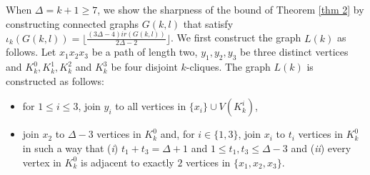 \documentclass[11pt]{article}
\newcommand{\2}{ \vspace{0.2cm} }
\newcommand{\1}{ \vspace{0.1cm} }
\begin{document}
\indent When $\Delta = k +1 \geq 7$, we show the sharpness of the bound of Theorem \ref{thm 2} by constructing connected graphs $G(k, l)$ that satisfy $\iota_{k}(G(k, l)) = \Big\lfloor\frac{(3\Delta - 4)ir(G(k, l))}{2\Delta - 2}\Big\rfloor$.  We first construct the graph $L(k)$ as follows. Let $x_{1}x_{2}x_{3}$ be a path of length two, $y_{1}, y_{2}, y_{3}$ be three distinct vertices and $K^{0}_{k}, K^{1}_{k}, K^{2}_{k}$ and $K^{3}_{k}$ be four disjoint $k$-cliques. The graph $L(k)$ is constructed as follows:
\begin{itemize}
  \item for $1 \leq i \leq 3$, join $y_{i}$ to all vertices in $\{x_{i}\} \cup V(K^{i}_{k})$,
  \item join $x_{2}$ to $\Delta - 3$ vertices in $K^{0}_{k}$ and, for $i \in \{1, 3\}$, join $x_{i}$ to $t_{i}$ vertices in $K^{0}_{k}$ in such a way that (\emph{i}) $t_{1} + t_{3} = \Delta + 1$ and $1 \leq t_{1}, t_{3} \leq \Delta - 3$ and (\emph{ii}) every vertex in $K^{0}_{k}$ is adjacent to exactly $2$ vertices in $\{x_{1}, x_{2}, x_{3}\}$.
\end{itemize}
\end{document}
